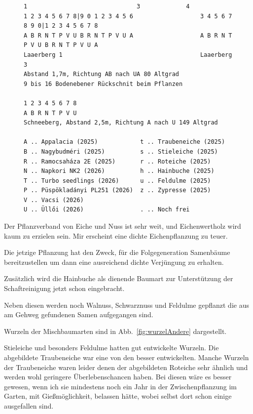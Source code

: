 \documentclass[twocolumn]{scrartcl}
\begin{document}
\begin{figure}[htb]
\begin{Verbatim}[fontsize=\footnotesize]
                  1                               3             4
1 2 3 4 5 6 7 8|9 0 1 2 3 4 5 6                   3 4 5 6 7 8 9 0|1 2 3 4 5 6 7 8
A B R N T P V U B R N T P V U A                   A B R N T P V U B R N T P V U A
Laaerberg 1                                       Laaerberg 3
Abstand 1,7m, Richtung AB nach UA 80 Altgrad
9 bis 16 Bodenebener Rückschnit beim Pflanzen

1 2 3 4 5 6 7 8
A B R N T P V U
Schneeberg, Abstand 2,5m, Richtung A nach U 149 Altgrad

A .. Appalacia (2025)            t .. Traubeneiche (2025)
B .. Nagybudméri (2025)          s .. Stieleiche (2025)
R .. Ramocsaháza 2E (2025)       r .. Roteiche (2025)
N .. Napkori NK2 (2026)          h .. Hainbuche (2025)
T .. Turbo seedlings (2026)      u .. Feldulme (2025)
P .. Püspökladányi PL251 (2026)  z .. Zypresse (2025)
V .. Vacsi (2026)
U .. Üllői (2026)                . .. Noch frei
\end{Verbatim}
\label{fig:versuchsflaeche}
\end{figure}

Der Pflanzverband von Eiche und Nuss ist sehr weit, und Eichenwertholz
wird kaum zu erzielen sein. Mir erscheint eine dichte Eichenpflanzung
zu teuer.

Die jetzige Pflanzung hat den Zweck, für die Folgegeneration
Samenbäume bereitzustellen um dann eine ausreichend dichte Verjüngung
zu erhalten.

Zusätzlich wird die Hainbuche als dienende Baumart zur Unterstützung
der Schaftreinigung jetzt schon eingebracht.

Neben diesen werden noch Walnuss, Schwarznuss und Feldulme gepflanzt
die aus am Gehweg gefundenen Samen aufgegangen sind.

Wurzeln der Mischbaumarten sind in Abb.~\ref{fig:wurzelAndere}
dargestellt.

Stieleiche und besonders Feldulme hatten gut entwickelte Wurzeln. Die
abgebildete Traubeneiche war eine von den besser entwickelten. Manche
Wurzeln der Traubeneiche waren leider denen der abgebildeten Roteiche
sehr ähnlich und werden wohl geringere Überlebenschancen haben. Bei
diesen wäre es besser gewesen, wenn ich sie mindestens noch ein Jahr
in der Zwischenpflanzung im Garten, mit Gießmöglichkeit, belassen
hätte, wobei selbst dort schon einige ausgefallen sind.
\end{document}
